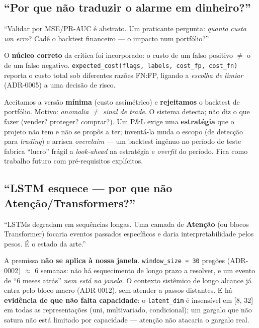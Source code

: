 \subsection{``Por que não traduzir o alarme em dinheiro?''}
\label{sec:debate-backtest}

\begin{confronto}
``Validar por MSE/PR-AUC é abstrato. Um praticante pergunta: \emph{quanto custa um erro}? Cadê o
backtest financeiro --- o impacto num portfólio?''
\end{confronto}

O \textbf{núcleo correto} da crítica foi incorporado: o custo de um falso positivo $\ne$ o de um
falso negativo. \texttt{expected\_cost(flags, labels, cost\_fp, cost\_fn)} reporta o custo total sob
diferentes razões FN:FP, ligando a \emph{escolha de limiar} (ADR-0005) a uma decisão de risco.

\begin{tradeoff}
Aceitamos a versão \textbf{mínima} (custo assimétrico) e \textbf{rejeitamos} o backtest de portfólio.
Motivo: \emph{anomalia $\ne$ sinal de trade}. O sistema detecta; não diz o que fazer (vender? proteger?
comprar?). Um P\&L exige uma \textbf{estratégia} que o projeto não tem e não se propôs a ter; inventá-la
muda o escopo (de detecção para \emph{trading}) e arrisca \emph{overclaim} --- um backtest ingênuo no
período de teste fabrica ``lucro'' frágil a \emph{look-ahead} na estratégia e \emph{overfit} do período.
Fica como trabalho futuro com pré-requisitos explícitos.
\end{tradeoff}

\subsection{``LSTM esquece --- por que não Atenção/Transformers?''}
\label{sec:debate-atencao}

\begin{confronto}
``LSTMs degradam em sequências longas. Uma camada de \textbf{Atenção} (ou blocos Transformer)
focaria eventos passados específicos e daria interpretabilidade pelos pesos. É o estado da arte.''
\end{confronto}

A premissa \textbf{não se aplica à nossa janela}. \texttt{window\_size = 30} pregões (ADR-0002)
$\approx$ 6 semanas: não há esquecimento de longo prazo a resolver, e um evento de ``6 meses atrás''
\emph{nem está na janela}. O contexto sistêmico de longo alcance já entra pelo bloco macro (ADR-0012),
sem atender a passos distantes. E há \textbf{evidência de que não falta capacidade}: o
\texttt{latent\_dim} é insensível em [8, 32] em todas as representações (uni, multivariado, condicional);
um gargalo que não satura não está limitado por capacidade --- atenção não atacaria o gargalo real.

